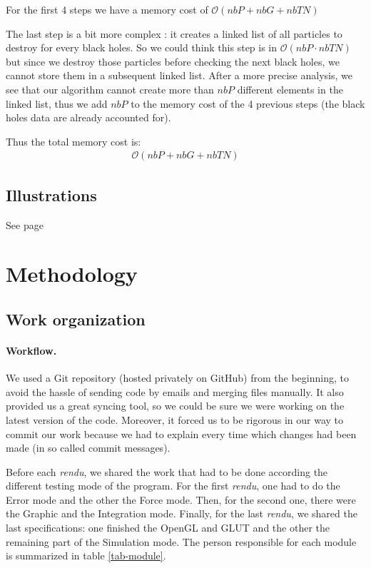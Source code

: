 \documentclass[a4paper]{article} %
\begin{document}
\begin{multicols*}{2}
For the first 4 steps we have a memory cost of $\mathcal{O}(nbP + nbG + nbTN)$

The last step is a bit more complex :
it creates a linked list of all particles to destroy for every black holes.
So we could think this step is in $\mathcal{O}(nbP \cdot nbTN)$ but since we destroy those particles before
checking the next black holes, we cannot store them in a subsequent linked list.
After a more precise analysis, we see that our algorithm cannot create more than $nbP$ different
elements in the linked list, thus we add $nbP$ to the memory cost of the 4 previous steps
(the black holes data are already accounted for).

Thus the total memory cost is:
\begin{align}
\mathcal{O}(nbP + nbG + nbTN)
\end{align}


\subsection{Illustrations}
See page \pageref{lastpage}

\section{Methodology}
\subsection{Work organization}

\paragraph{Workflow.} We used a Git repository (hosted privately on GitHub) from the beginning,
to avoid the hassle of sending code by emails and merging files manually.
It also provided us a great syncing tool, so we could be sure we were working on
the latest version of the code.
Moreover, it forced us to be rigorous in our way to commit our work
because we had to explain every time which changes had been made
(in so called commit messages).

Before each \emph{rendu}, we shared the work that had to be done
according the different testing mode of the program.
For the first \emph{rendu}, one had to do the Error mode and the other the Force mode.
Then, for the second one, there were the Graphic and the Integration mode.
Finally, for the last \emph{rendu}, we shared the last specifications:
one finished the OpenGL and GLUT
and the other the remaining part of the Simulation mode.
The person responsible for each module is summarized in table \ref{tab-module}.


\end{multicols*}
\end{document}
